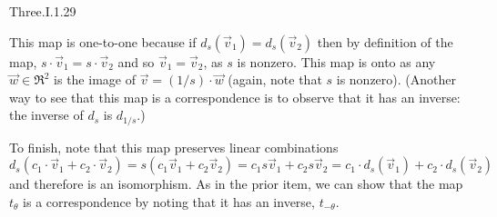 \begin{ans}{Three.I.1.29}
      \begin{exparts}
        \partsitem
          This map is one-to-one because if \( d_s(\vec{v}_1)=d_s(\vec{v}_2) \)
          then by definition of the map,
          \( s\cdot\vec{v}_1=s\cdot\vec{v}_2 \) and so
          \( \vec{v}_1=\vec{v}_2 \), as \( s \) is nonzero.
          This map is onto as any \( \vec{w}\in\Re^2 \) is the image of
          \( \vec{v}=(1/s)\cdot\vec{w} \) (again, note that $s$ is nonzero).
          (Another way to see that this map
          is a correspondence is to observe that it has
          an inverse: the inverse of \( d_s \) is \( d_{1/s} \).)

          To finish, note that this map preserves linear combinations
          \begin{equation*}
            d_s(c_1\cdot\vec{v}_1+c_2\cdot\vec{v}_2)
            =s(c_1\vec{v}_1+c_2\vec{v}_2)
            =c_1s\vec{v}_1+c_2s\vec{v}_2
            =c_1\cdot d_s(\vec{v}_1)+c_2\cdot d_s(\vec{v}_2)
          \end{equation*}
          and therefore is an isomorphism.
        \partsitem As in the prior item, we can show that the map $t_\theta$
          is a correspondence by noting that it has an inverse, $t_{-\theta}$.


\end{exparts}
\end{ans}
